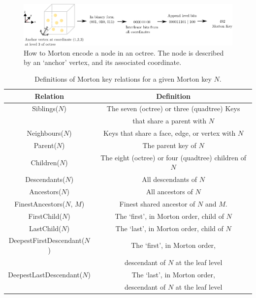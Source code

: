 \begin{figure}[h]
    \includegraphics[width=\textwidth]{images/ch_3/morton.pdf}
    \caption{How to Morton encode a node in an octree. The node is described by an ‘anchor’ vertex, and its associated coordinate.}
    \label{fig:chpt:3:sec:0:morton}
\end{figure}


\begin{table}[h!]
\centering
\begin{tabular}{||c c||}
    \hline
    Relation & Definition \\ [0.5ex]
    \hline\hline
    Siblings($N$) & The seven (octree) or three (quadtree) Keys \\
        & that share a parent with $N$  \\
    Neighbours($N$) & Keys that share a face, edge, or vertex with $N$  \\
    Parent($N$) & The parent key of $N$  \\
    Children($N$) & The eight (octree) or four (quadtree) children of $N$  \\
    Descendants($N$) & All descendants of $N$  \\
    Ancestors($N$) & All ancestors of $N$  \\
    FinestAncestors($N$, $M$) & Finest shared ancestor of $N$ and $M$.  \\
    FirstChild($N$) & The `first', in Morton order, child of $N$  \\
    LastChild($N$) & The `last', in Morton order, child of $N$  \\
    DeepestFirstDescendant($N$) & The `first', in Morton order,  \\
        &  descendant of $N$ at the leaf level \\
    DeepestLastDescendant($N$) & The `last', in Morton order, \\
        & descendant of $N$ at the leaf level \\

    \hline
\end{tabular}
\caption{Definitions of Morton key relations for a given Morton key $N$.}
\label{table:chpt:3:sec:0:morton}
\end{table}

